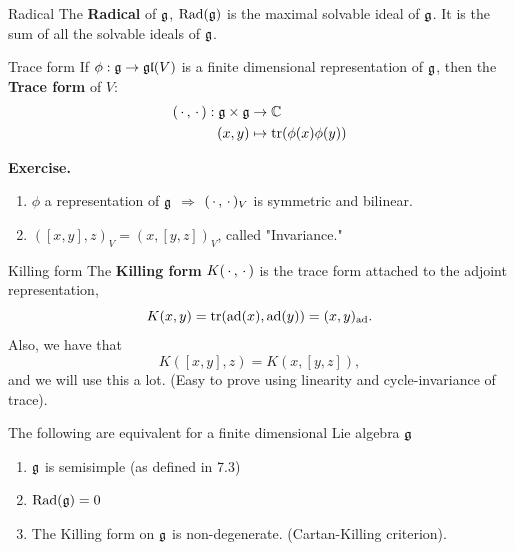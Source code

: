 \documentclass{article}
\begin{document}
\endproof
\begin{fancydefine}{Radical}
    The \textbf{Radical} of $\mathfrak{g}$, $\operatorname{Rad} (\mathfrak{g})$ is the maximal solvable ideal of $\mathfrak{g}$. It is the sum of all the solvable ideals of $\mathfrak{g}$.
\end{fancydefine}
\begin{fancydefine}{Trace form}
    If $\phi : \mathfrak{g} \to \mathfrak{gl}(V)$ is a finite dimensional representation of $\mathfrak{g}$, then the \textbf{Trace form} of $V$: \begin{align*} 
        (\, \cdot \,, \, \cdot \,) : \mathfrak{g} \times \mathfrak{g} &\to \mathbb{C}\\
        (x,y) &\mapsto \tr(\phi(x)\phi(y))
    \end{align*}
\end{fancydefine}
\textbf{Exercise. } \begin{enumerate}
    \item $\phi$ a representation of $\mathfrak{g}$ $\Rightarrow$ $(\, \cdot \,, \, \cdot \,)_{V}$ is symmetric and bilinear.
    \item $([x,y],z)_{V} = (x,[y,z])_{V}$, called "Invariance."
\end{enumerate}
\begin{fancydefine}{Killing form}
    The \textbf{Killing form} $K(\, \cdot \,, \, \cdot \,)$ is the trace form attached to the adjoint representation, \[ K(x,y) = \tr( \operatorname{ad}(x), \operatorname{ad}(y)) = (x,y)_{\operatorname{ad}}.\]
    Also, we have that \[ K([x,y],z) = K(x,[y,z]),\] and we will use this a lot. (Easy to prove using linearity and cycle-invariance of trace).
\end{fancydefine}
\newlec \begin{fancythm}{}
    The following are equivalent for a finite dimensional Lie algebra $\mathfrak{g}$ \begin{enumerate}
        \item $\mathfrak{g}$ is semisimple (as defined in 7.3)
        \item $\operatorname{Rad} (\mathfrak{g}) = 0$
        \item The Killing form on $\mathfrak{g}$ is non-degenerate. (Cartan-Killing criterion).
    \end{enumerate}
\end{fancythm}
\end{document}
